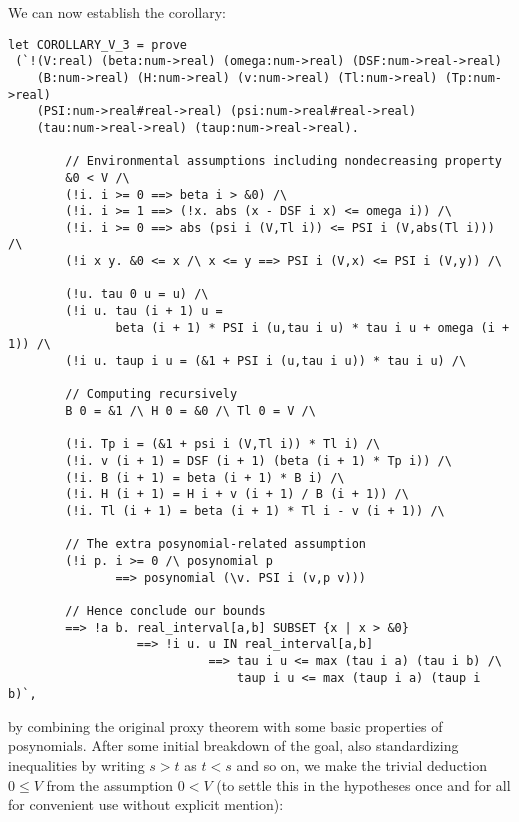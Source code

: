 \documentclass[10pt]{article}
\theoremstyle{definition}
\theoremstyle{remark}
\numberwithin{equation}{section}
\begin{document}
We can now establish the corollary:

\begin{scriptsize}\begin{verbatim}
let COROLLARY_V_3 = prove
 (`!(V:real) (beta:num->real) (omega:num->real) (DSF:num->real->real)
    (B:num->real) (H:num->real) (v:num->real) (Tl:num->real) (Tp:num->real)
    (PSI:num->real#real->real) (psi:num->real#real->real)
    (tau:num->real->real) (taup:num->real->real).

        // Environmental assumptions including nondecreasing property
        &0 < V /\
        (!i. i >= 0 ==> beta i > &0) /\
        (!i. i >= 1 ==> (!x. abs (x - DSF i x) <= omega i)) /\
        (!i. i >= 0 ==> abs (psi i (V,Tl i)) <= PSI i (V,abs(Tl i))) /\
        (!i x y. &0 <= x /\ x <= y ==> PSI i (V,x) <= PSI i (V,y)) /\

        (!u. tau 0 u = u) /\
        (!i u. tau (i + 1) u =
               beta (i + 1) * PSI i (u,tau i u) * tau i u + omega (i + 1)) /\
        (!i u. taup i u = (&1 + PSI i (u,tau i u)) * tau i u) /\

        // Computing recursively
        B 0 = &1 /\ H 0 = &0 /\ Tl 0 = V /\

        (!i. Tp i = (&1 + psi i (V,Tl i)) * Tl i) /\
        (!i. v (i + 1) = DSF (i + 1) (beta (i + 1) * Tp i)) /\
        (!i. B (i + 1) = beta (i + 1) * B i) /\
        (!i. H (i + 1) = H i + v (i + 1) / B (i + 1)) /\
        (!i. Tl (i + 1) = beta (i + 1) * Tl i - v (i + 1)) /\

        // The extra posynomial-related assumption
        (!i p. i >= 0 /\ posynomial p
               ==> posynomial (\v. PSI i (v,p v)))

        // Hence conclude our bounds
        ==> !a b. real_interval[a,b] SUBSET {x | x > &0}
                  ==> !i u. u IN real_interval[a,b]
                            ==> tau i u <= max (tau i a) (tau i b) /\
                                taup i u <= max (taup i a) (taup i b)`,
\end{verbatim}\end{scriptsize}

\noindent by combining the original proxy theorem with some basic properties of
posynomials. After some initial breakdown of the goal, also standardizing
inequalities by writing $s > t$ as $t < s$ and so on, we make the trivial
deduction $0 \leq V$ from the assumption $0 < V$ (to settle this in the
hypotheses once and for all for convenient use without explicit mention):
\end{document}
